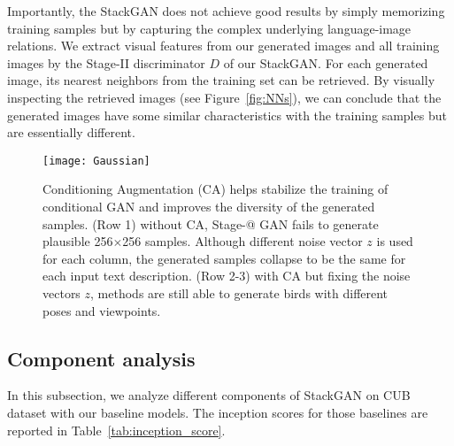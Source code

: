 \documentclass[10pt,twocolumn,letterpaper]{article}
\makeatletter
\newcommand{\Rmnum}[1]{\expandafter\@slowromancap\romannumeral #1@}
\makeatother
\begin{document}
Importantly, the StackGAN does not achieve good results by simply memorizing training samples but by capturing the complex underlying language-image relations. We extract visual features from our generated images and all training images by the Stage-II discriminator $D$ of our StackGAN. For each generated image, its nearest neighbors from the training set can be retrieved. By visually inspecting the retrieved images (see Figure~\ref{fig:NNs}), we can conclude that the generated images have some similar characteristics with the training samples but are essentially different. 


\begin{figure}[bt]
\begin{center}
	\texttt{[image: Gaussian]}
\end{center}
\vspace{-8pt}
   \caption{Conditioning Augmentation (CA) helps stabilize the training of conditional GAN and improves the diversity of the generated samples. 
   (Row 1) without CA, Stage-\Rmnum{1} GAN fails to generate plausible 256$\times$256 samples. Although different noise vector $z$ is used for each column, the generated samples collapse to be the same for each input text description. 
   (Row 2-3) with CA but fixing the noise vectors $z$, methods are still able to generate birds with different poses and viewpoints.}
\vspace{-3pt}
\label{fig:Gaussian}
\end{figure}


\vspace{-2pt}
\subsection{Component analysis}
\vspace{-5pt}

In this subsection, we analyze different components of StackGAN on CUB dataset with our baseline models. 
The inception scores for those baselines are reported in Table~\ref{tab:inception_score}.
\end{document}
